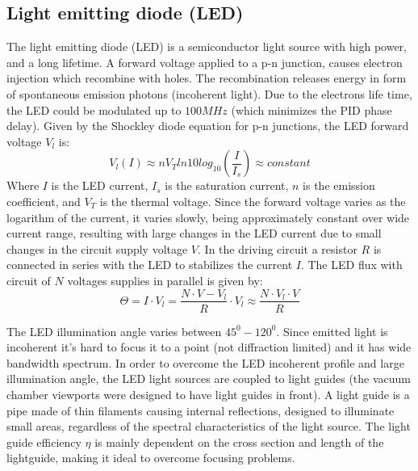 \documentclass[\main/master.tex]{subfiles}
\begin{document}
\subsection{Light emitting diode (LED)}
The light emitting diode (LED) is a semiconductor light source with high power, and a long lifetime. A forward voltage applied to a p-n junction, causes electron injection which recombine with holes. The recombination releases energy in form of spontaneous emission photons (incoherent light). Due to the electrons life time, the LED could be modulated up to $100MHz$ (which minimizes the PID phase delay). Given by the Shockley diode equation for p-n junctions, the LED forward voltage $V_l$ is:
\begin{equation}
V_l(I) \approx n V_T ln10 log_{10} (\frac{I}{I_s})\approx constant \label{eqn:led voltage}
\end{equation}
Where $I$ is the LED current, $I_s$ is the saturation current, $n$ is the emission coefficient, and $V_T$ is the thermal voltage. Since the forward voltage varies as the logarithm of the current, it varies slowly, being approximately constant over wide current range, resulting with large changes in the LED current due to small changes in the circuit supply voltage $V$. In the driving circuit a resistor $R$ is connected in series with the LED to stabilizes the current $I$. The LED flux with circuit of $N$ voltages supplies in parallel is given by:
\begin{equation}
\Theta = I\cdot V_l  =\frac{N\cdot V-V_l}{R}\cdot V_l\approx \frac{N\cdot V_l\cdot V}{R}\label{eqn:led power}
\end{equation}
\par\noindent
The LED illumination angle varies between $45^0-120^0$. Since emitted light is incoherent it's hard to focus it to a point (not diffraction limited) and it has wide bandwidth spectrum. In order to overcome the LED incoherent profile and large illumination angle, the LED light sources are coupled to light guides (the vacuum chamber viewports were designed to have light guides in front). A light guide is a pipe made of thin filaments causing internal reflections, designed to illuminate small areas, regardless of the spectral characteristics of the light source. The light guide efficiency $\eta$ is mainly dependent on the cross section and length of the lightguide, making it ideal to overcome focusing problems. 
\end{document}
